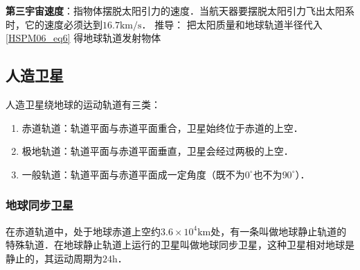\textbf{第三宇宙速度}：指物体摆脱太阳引力的速度．当航天器要摆脱太阳引力飞出太阳系时，它的速度必须达到$16.7\mathrm{km/s}$． 推导： 把太阳质量和地球轨道半径代入\autoref{HSPM06_eq6} 得地球轨道发射物体

\subsection{人造卫星}

人造卫星绕地球的运动轨道有三类：

\begin{enumerate}
\item 赤道轨道：轨道平面与赤道平面重合，卫星始终位于赤道的上空．
\item 极地轨道：轨道平面与赤道平面垂直，卫星会经过两极的上空．
\item 一般轨道：轨道平面与赤道平面成一定角度（既不为$0^\circ$也不为$90^\circ$）．
\end{enumerate}

\subsubsection{地球同步卫星}

在赤道轨道中，处于地球赤道上空约$3.6\times10^4\mathrm{km}$处，有一条叫做地球静止轨道的特殊轨道．在地球静止轨道上运行的卫星叫做地球同步卫星，这种卫星相对地球是静止的，其运动周期为$24\mathrm{h}$．
